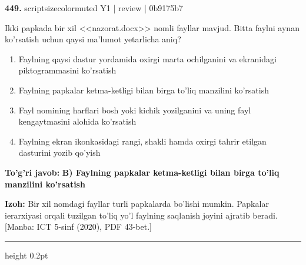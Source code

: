 \documentclass[10pt,a4paper]{article}
\begin{document}
{\bfseries\sffamily\color{ink} 449.} {scriptsizecolor{muted} Y1 | review | 0b9175b7}
\par
Ikki papkada bir xil <<nazorat.docx>> nomli fayllar mavjud. Bitta faylni aynan ko'rsatish uchun qaysi ma'lumot yetarlicha aniq?
\begin{enumerate}[label=\Alph*),leftmargin=9mm]
\item Faylning qaysi dastur yordamida oxirgi marta ochilganini va ekranidagi piktogrammasini ko'rsatish
\item Faylning papkalar ketma-ketligi bilan birga to'liq manzilini ko'rsatish
\item Fayl nomining harflari bosh yoki kichik yozilganini va uning fayl kengaytmasini alohida ko'rsatish
\item Faylning ekran ikonkasidagi rangi, shakli hamda oxirgi tahrir etilgan dasturini yozib qo'yish
\end{enumerate}
\begin{tcolorbox}[enhanced,breakable,colback=teal!4,colframe=teal!60!black,boxrule=0.45pt,arc=1.2mm,left=2.7mm,right=2.7mm,top=1.8mm,bottom=1.8mm,before skip=2mm,after skip=2mm]
{\bfseries\sffamily\color{teal}To'g'ri javob:} \textbf{B) Faylning papkalar ketma-ketligi bilan birga to'liq manzilini ko'rsatish}
\par\smallskip
{\bfseries Izoh:} Bir xil nomdagi fayllar turli papkalarda bo'lishi mumkin. Papkalar ierarxiyasi orqali tuzilgan to'liq yo'l faylning saqlanish joyini ajratib beradi. [Manba: ICT 5-sinf (2020), PDF 43-bet.]
\end{tcolorbox}
\vspace{2mm}\hrule height 0.2pt\vspace{3mm}
\end{document}
